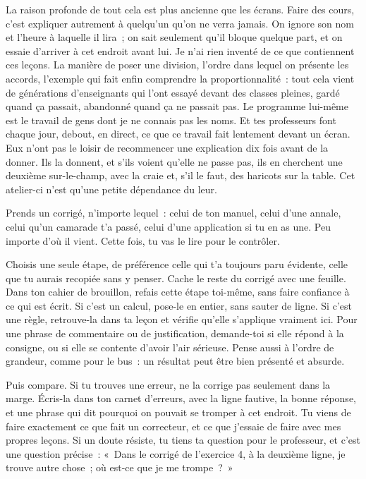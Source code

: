 \documentclass[10.5pt,twoside,openright]{book}
\newcommand{\soustitre}[1]{\par\vspace{1.1em}\noindent{\bfseries\color{accent}#1}\par\vspace{0.4em}\noindent}
\begin{document}
La raison profonde de tout cela est plus ancienne que les écrans. Faire des cours, c’est expliquer autrement à quelqu’un qu’on ne verra jamais. On ignore son nom et l’heure à laquelle il lira ; on sait seulement qu’il bloque quelque part, et on essaie d’arriver à cet endroit avant lui. Je n’ai rien inventé de ce que contiennent ces leçons. La manière de poser une division, l’ordre dans lequel on présente les accords, l’exemple qui fait enfin comprendre la proportionnalité : tout cela vient de générations d’enseignants qui l’ont essayé devant des classes pleines, gardé quand ça passait, abandonné quand ça ne passait pas. Le programme lui-même est le travail de gens dont je ne connais pas les noms. Et tes professeurs font chaque jour, debout, en direct, ce que ce travail fait lentement devant un écran. Eux n’ont pas le loisir de recommencer une explication dix fois avant de la donner. Ils la donnent, et s’ils voient qu’elle ne passe pas, ils en cherchent une deuxième sur-le-champ, avec la craie et, s’il le faut, des haricots sur la table. Cet atelier-ci n’est qu’une petite dépendance du leur.

\soustitre{Ce soir, essaie ceci}

Prends un corrigé, n’importe lequel : celui de ton manuel, celui d’une annale, celui qu’un camarade t’a passé, celui d’une application si tu en as une. Peu importe d’où il vient. Cette fois, tu vas le lire pour le contrôler.

Choisis une seule étape, de préférence celle qui t’a toujours paru évidente, celle que tu aurais recopiée sans y penser. Cache le reste du corrigé avec une feuille. Dans ton cahier de brouillon, refais cette étape toi-même, sans faire confiance à ce qui est écrit. Si c’est un calcul, pose-le en entier, sans sauter de ligne. Si c’est une règle, retrouve-la dans ta leçon et vérifie qu’elle s’applique vraiment ici. Pour une phrase de commentaire ou de justification, demande-toi si elle répond à la consigne, ou si elle se contente d’avoir l’air sérieuse. Pense aussi à l’ordre de grandeur, comme pour le bus : un résultat peut être bien présenté et absurde.

Puis compare. Si tu trouves une erreur, ne la corrige pas seulement dans la marge. Écris-la dans ton carnet d’erreurs, avec la ligne fautive, la bonne réponse, et une phrase qui dit pourquoi on pouvait se tromper à cet endroit. Tu viens de faire exactement ce que fait un correcteur, et ce que j’essaie de faire avec mes propres leçons. Si un doute résiste, tu tiens ta question pour le professeur, et c’est une question précise : « Dans le corrigé de l’exercice 4, à la deuxième ligne, je trouve autre chose ; où est-ce que je me trompe ? »
\end{document}
